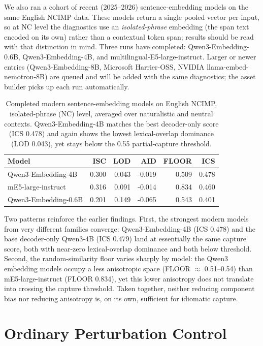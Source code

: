 \documentclass[11pt]{article}
\begin{document}
We also ran a cohort of recent (2025--2026) sentence-embedding models on the same English NCIMP
data. These models return a single pooled vector per input, so at NC level the diagnostics use an
\emph{isolated-phrase} embedding (the span text encoded on its own) rather than a contextual token
span; results should be read with that distinction in mind. Three runs have completed:
Qwen3-Embedding-0.6B, Qwen3-Embedding-4B, and multilingual-E5-large-instruct. Larger or newer
entries (Qwen3-Embedding-8B, Microsoft Harrier-OSS, NVIDIA llama-embed-nemotron-8B) are queued and
will be added with the same diagnostics; the asset builder picks up each run automatically.

\begin{table}[H]
\centering
\small
\begin{tabular}{lrrrrr}
\toprule
Model & ISC & LOD & AID & FLOOR & ICS \\
\midrule
Qwen3-Embedding-4B & 0.300 & 0.043 & -0.019 & 0.509 & 0.478 \\
mE5-large-instruct & 0.316 & 0.091 & -0.014 & 0.834 & 0.460 \\
Qwen3-Embedding-0.6B & 0.201 & 0.149 & -0.065 & 0.543 & 0.401 \\
\bottomrule
\end{tabular}
\caption{Completed modern sentence-embedding models on English NCIMP, isolated-phrase (NC) level,
averaged over naturalistic and neutral contexts. Qwen3-Embedding-4B matches the best decoder-only
score (ICS 0.478) and again shows the lowest lexical-overlap dominance (LOD 0.043), yet stays below
the 0.55 partial-capture threshold.}
\label{tab:emb}
\end{table}

Two patterns reinforce the earlier findings. First, the strongest modern models from very different
families converge: Qwen3-Embedding-4B (ICS 0.478) and the base decoder-only Qwen3-4B (ICS 0.479)
land at essentially the same capture score, both with near-zero lexical-overlap dominance and both
below threshold. Second, the random-similarity floor varies sharply by model: the Qwen3 embedding
models occupy a less anisotropic space (FLOOR $\approx$ 0.51--0.54) than mE5-large-instruct
(FLOOR 0.834), yet this lower anisotropy does not translate into crossing the capture threshold.
Taken together, neither reducing component bias nor reducing anisotropy is, on its own, sufficient
for idiomatic capture.

\section{Ordinary Perturbation Control}
\end{document}
